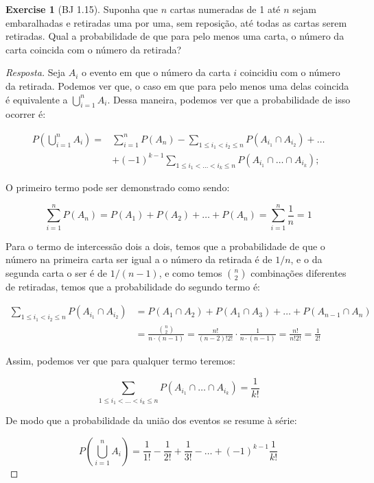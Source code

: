 \documentclass[
]{article}
\theoremstyle{definition}
\theoremstyle{definition}
\theoremstyle{definition}
\newtheorem{exercise}{Exercise}[section]
\theoremstyle{definition}
\theoremstyle{remark}
\begin{document}
\begin{exercise}[BJ 1.15]

Suponha que \(n\) cartas numeradas de 1 até \(n\) sejam embaralhadas e retiradas uma por uma, sem reposição, até todas as cartas serem retiradas. Qual a probabilidade de que para pelo menos uma carta, o número da carta coincida com o número da retirada?

\begin{proof}[Resposta]
Seja \(A_{i}\) o evento em que o número da carta \(i\) coincidiu com o número da retirada. Podemos ver que, o caso em que para pelo menos uma delas coincida é equivalente a \(\bigcup_{i=1}^{n}A_{i}\). Dessa maneira, podemos ver que a probabilidade de isso ocorrer é:

\begin{align*}
P\left(\bigcup_{i=1}^{n} A_{i}\right) = &\sum_{i=1}^{n}P(A_{n}) - \sum_{1 \le i_{1} < i_{2} \le n}P(A_{i_{1}} \cap A_{i_{2}}) + \dots \\
&+ (-1)^{k-1} \sum_{1 \le i_{1} < \dots < i_{k} \le n}P(A_{i_{1}} \cap \dots \cap A_{i_{k}});
\end{align*}

O primeiro termo pode ser demonstrado como sendo:

\begin{equation*}
\sum_{i=1}^{n}P(A_{n}) = P(A_{1}) + P(A_{2}) + \dots + P(A_{n}) = \sum_{i=1}^{n}\frac{1}{n} = 1
\end{equation*}

Para o termo de intercessão dois a dois, temos que a probabilidade de que o número na primeira carta ser igual a o número da retirada é de \(1/n\), e o da segunda carta o ser é de \(1/(n-1)\), e como temos \(\binom{n}{2}\) combinações diferentes de retiradas, temos que a probabilidade do segundo termo é:

\begin{align*}
\sum_{1 \le i_{1} < i_{2} \le n}P(A_{i_{1}} \cap A_{i_{2}}) &= P(A_{1} \cap A_{2}) + P(A_{1} \cap A_{3}) + \dots + P(A_{n-1} \cap A_{n}) \\
&= \frac{\binom{n}{2}}{n \cdot (n-1)} = \frac{n!}{(n-2)!2!} \cdot \frac{1}{n \cdot (n-1)} = \frac{n!}{n!2!} = \frac{1}{2!}
\end{align*}

Assim, podemos ver que para qualquer termo teremos:

\begin{equation*}
\sum_{1 \le i_{1} < \dots < i_{k} \le n}P(A_{i_{1}} \cap \dots \cap A_{i_{k}}) = \frac{1}{k!}
\end{equation*}

De modo que a probabilidade da união dos eventos se resume à série:

\begin{equation*}
P\left(\bigcup_{i=1}^{n} A_{i}\right) = \frac{1}{1!} - \frac{1}{2!} + \frac{1}{3!} - \dots + (-1)^{k-1}\frac{1}{k!}
\end{equation*}
\end{proof}

\end{exercise}
\end{document}
